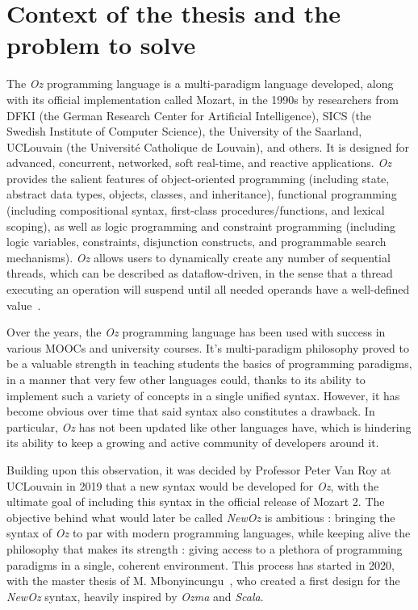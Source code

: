 
\section{Context of the thesis and the problem to solve}\label{sec:ch1-context}
The \textit{Oz} programming language is a multi-paradigm language developed, along with its official implementation called Mozart, in the 1990s by researchers from DFKI (the German Research Center for Artificial Intelligence), SICS (the Swedish Institute of Computer Science), the University of the Saarland, UCLouvain (the Université Catholique de Louvain), and others.
It is designed for advanced, concurrent, networked, soft real-time, and reactive applications.
\textit{Oz} provides the salient features of object-oriented programming (including state, abstract data types, objects, classes, and inheritance),
functional programming (including compositional syntax, first-class procedures/functions, and lexical scoping), as well as
logic programming and constraint programming (including logic variables, constraints, disjunction constructs, and programmable search mechanisms).
\textit{Oz} allows users to dynamically create any number of sequential threads, which can be described as dataflow-driven, in the sense that a thread executing an operation will suspend until all needed operands have a well-defined value~\cite{mozart2tutorial}.\newline

Over the years, the \textit{Oz} programming language has been used with success in various MOOCs and university courses.
It's multi-paradigm philosophy proved to be a valuable strength in teaching students the basics of programming paradigms, in a manner that very few other languages could, thanks to its ability to implement such a variety of concepts in a single unified syntax.
However, it has become obvious over time that said syntax also constitutes a drawback.
In particular, \textit{Oz} has not been updated like other languages have, which is hindering its ability to keep a growing and active community of developers around it.\newline

Building upon this observation, it was decided by Professor Peter Van Roy at UCLouvain in 2019 that a new syntax would be developed for \textit{Oz}, with the ultimate goal of including this syntax in the official release of Mozart 2.
The objective behind what would later be called \textit{NewOz} is ambitious : bringing the syntax of \textit{Oz} to par with modern programming languages, while keeping alive the philosophy that makes its strength : giving access to a plethora of programming paradigms in a single, coherent environment.
This process has started in 2020, with the master thesis of M. Mbonyincungu~\cite{jpthesis}, who created a first design for the \textit{NewOz} syntax, heavily inspired by \textit{Ozma} and \textit{Scala}.\newline

